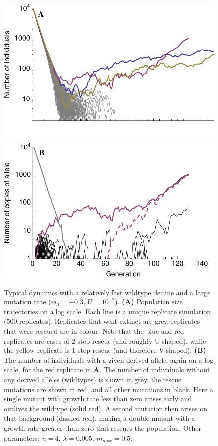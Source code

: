 \documentclass[9pt,twocolumn,twoside,lineno]{gsajnl}
\begin{document}
\begin{figure}[!h]
\centering
\includegraphics[width=\linewidth]{Ushape.pdf}\\
\includegraphics[width=\linewidth]{UshapeMutations.pdf}
\caption{
Typical dynamics with a relatively fast wildtype decline and a large mutation rate ($m_0 = -0.3$, $U=10^{-2}$).
\textbf{(A)} Population size trajectories on a log scale.
Each line is a unique replicate simulation (500 replicates).
Replicates that went extinct are grey, replicates that were rescued are in colour.
Note that the blue and red replicates are cases of 2-step rescue (and roughly U-shaped), while the yellow replicate is 1-step rescue (and therefore V-shaped).
\textbf{(B)} The number of individuals with a given derived allele, again on a log scale, for the red replicate in \textbf{A}.
The number of individuals without any derived alleles (wildtypes) is shown in grey, the rescue mutations are shown in red, and all other mutations in black.
Here a single mutant with growth rate less than zero arises early and outlives the wildtype (solid red).
A second mutation then arises on that background (dashed red), making a double mutant with a growth rate greater than zero that rescues the population. 
Other parameters: $n=4$, $\lambda=0.005$, $m_{max}=0.5$.
}%
\label{fig:Ushape}
\end{figure}
\end{document}
